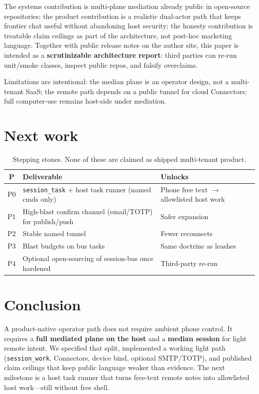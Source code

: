 \documentclass[11pt,a4paper]{article}
\begin{document}
The systems contribution is multi-plane mediation already public in open-source
repositories; the product contribution is a realistic dual-actor path that keeps
frontier chat useful without abandoning host security; the honesty contribution is
treatable claim ceilings as part of the architecture, not post-hoc marketing
language. Together with public release notes on the author site, this paper is
intended as a \textbf{scrutinizable architecture report}: third parties can re-run
unit/smoke classes, inspect public repos, and falsify overclaims.

Limitations are intentional: the median plane is an operator design, not a
multi-tenant SaaS; the remote path depends on a public tunnel for cloud Connectors;
full computer-use remains host-side under mediation.

\section{Next work}

\begin{table}[h]
\centering
\small
\begin{tabularx}{\textwidth}{@{}cX X@{}}
\toprule
\textbf{P} & \textbf{Deliverable} & \textbf{Unlocks} \\
\midrule
P0 & \texttt{session\_task} + host task runner (named cmds only) & Phone free text $\rightarrow$ allowlisted host work \\
P1 & High-blast confirm channel (email/TOTP) for publish/push & Safer expansion \\
P2 & Stable named tunnel & Fewer reconnects \\
P3 & Blast budgets on bus tasks & Same doctrine as leashes \\
P4 & Optional open-sourcing of session-bus once hardened & Third-party re-run \\
\bottomrule
\end{tabularx}
\caption{Stepping stones. None of these are claimed as shipped multi-tenant product.}
\label{tab:next}
\end{table}

\section{Conclusion}

A product-native operator path does not require ambient phone control. It requires
a \textbf{full mediated plane on the host} and a \textbf{median session} for light
remote intent. We specified that split, implemented a working light path
(\texttt{session\_work}, Connectors, device bind, optional SMTP/TOTP), and published
claim ceilings that keep public language weaker than evidence. The next milestone is
a host task runner that turns free-text remote notes into allowlisted host
work---still without free shell.
\end{document}
